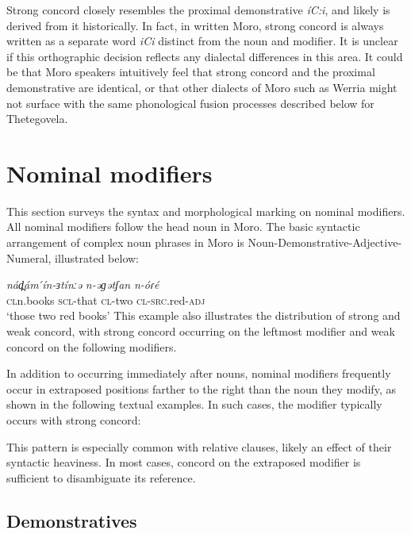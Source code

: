 Strong concord closely resembles the proximal demonstrative \textit{íC:i}, and likely is derived from it historically. In fact, in written Moro, strong concord is always written as a separate word \textit{iCi} distinct from the noun and modifier. It is unclear if this orthographic decision reflects any dialectal differences in this area. It could be that Moro speakers intuitively feel that strong concord and the proximal demonstrative are identical, or that other dialects of Moro such as Werria might not surface with the same phonological fusion processes described below for Thetegovela. %

\section{Nominal modifiers}

This section surveys the syntax and morphological marking on nominal modifiers. All nominal modifiers follow the head noun in Moro. The basic syntactic arrangement of complex noun phrases in Moro is Noun-Demonstrative-Adjective-Numeral, illustrated below:


\ea \label{ex:ch8:1}
\gll	\textit{nád̪ám}	\textit{́ín-ɜtínːə}	\textit{n-əɡətʃan}	\textit{n-óɾé}	   \\
			\textsc{cl}n.books	\textsc{scl}-that	\textsc{cl}-two	\textsc{cl}-\textsc{src}.red-\textsc{adj}\\
	\glt	‘those two red books’
\z 
This example also illustrates the distribution of strong and weak concord, with strong concord occurring on the leftmost modifier and weak concord on the following modifiers. 

In addition to occurring immediately after nouns, nominal modifiers frequently occur in extraposed positions farther to the right than the noun they modify, as shown in the following textual examples. In such cases, the modifier typically occurs with strong concord:


This pattern is especially common with relative clauses, likely an effect of their syntactic heaviness. In most cases, concord on the extraposed modifier is sufficient to disambiguate its reference.

\subsection{Demonstratives}\label{demonstratives}

